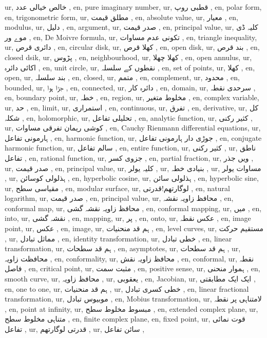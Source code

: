 ur, خالص خیالی عدد ,
en, pure imaginary number,
ur, قطبی روپ ,
en, polar form,
en, trigonometric form,
ur, مطلق قیمت ,
en, absolute value,
ur, معیار ,
en, modulus,
ur, دلیل ,
en, argument,
ur, صدر قیمت ,
en, principal value,
ur,  کلیہ ڈی موے ور ,
en, De Moivre formula,
ur, تکونی عدم مساوات ,
en, triangle inequality,
ur, دائری قرص ,
en, circular disk,
ur, کھلا قرص ,
en, open disk,
ur, بند قرص ,
en, closed dsik,
ur, پڑوس ,
en, neighbourhood,
ur, کھلا چھلا ,
en, open annulus,
ur, اکائی دائرہ ,
en, unit circle,
ur, نقطوں کے سلسلہ ,
en, set of points,
ur, کھلا ,
en, open,
ur, بند سلسلہ ,
en, closed,
ur, متمم ,
en, complement,
ur, محدود ,
en, bounded,
ur, جڑا ہوا ,
en, connected,
ur, دائرہ کار ,
en, domain,
ur, سرحدی نقطہ ,
en, boundary point,
ur, خطہ ,
en, region,
ur, مخلوط متغیر ,
en, complex variable,
ur, حد ,
en, limit,
ur, استمراری ,
en, continuous,
ur, تفرق ,
en, derivative,
ur, کل شکلہ ,
en, holomorphic,
ur, تحلیلی تفاعل ,
en, analytic function,
ur, کثیر رکنی ,
ur, کوشی ریمان تفرقی مساوات ,
en, Cauchy Rienmann differential equations,
ur, ہارمونی تفاعل ,
en, harmonic function,
ur, جوڑی دار ہارمونی تفاعل ,
en, conjugate harmonic function,
ur, سالم تفاعل ,
en, entire function,
ur, کثیر رکنی ,
ur, ناطق تفاعل ,
en, rational function,
ur, جزوی کسر ,
en, partial fraction,
ur, ویں جذر ,
ur, صدر قیمت ,
en, principal value,
ur, کلیہ یولر ,
ur, بنیادی خطہ ,
ur, مساوات یولر ,
ur, ہذلولی کوسائن ,
en, hyperbolic cosine,
ur, ہذلولی سائن ,
en, hyperbolic sine,
ur, مقیاسی سطح ,
en, modular surface,
ur, لوگارتھم!قدرتی ,
en, natural logarithm,
ur, صدر قیمت ,
en, principal value,
ur, محافظ زاویہ نقشہ ,
en, conformal map,
ur, محافظ زاویہ نقشہ گشی ,
en, conformal mapping,
ur, میں ,
en, into,
ur, نقشہ گشی ,
en, mapping,
ur, پر ,
en, onto,
ur, عکس نقطہ ,
en, image point,
ur, عکس ,
en, image,
ur, ہم قد منحنیات ,
en, level curves,
ur, مستقیم حرکت ,
ur, مماثل تبادل ,
en, identity transformation,
ur, خطی تبادل ,
en, linear transformation,
ur, ہم قد سطحات ,
en, asymptotes,
ur, ہم قد سطحات ,
ur, محافظت زاویہ ,
en, conformality,
ur, محافظ زاویہ نقش ,
en, conformal,
ur, نقطہ فاصل ,
en, critical point,
ur, مثبت سمت ,
en, positive sense,
ur, ہموار منحنی ,
en, smooth curve,
ur, محافظ زاویہ ,
ur, یعقوبی ,
en, Jacobian,
ur, ایک ایک مطابقتی ,
en, one to one,
ur, ہم قد منحنیات ,
ur, خطی کسری تبادل ,
en, linear fractional transformation,
ur, موبیوس تبادل ,
en, Mobius transformation,
ur, لامتناہی پر نقطہ ,
en, point at infinity,
ur, مبسوط مخلوط سطح ,
en, extended complex plane,
ur, متناہی مخلوط سطح ,
en, finite complex plane,
en, fixed point,
ur, قوت نمائی تفاعل ,
ur, قدرتی لوگارتھم ,
ur, سائن تفاعل ,
